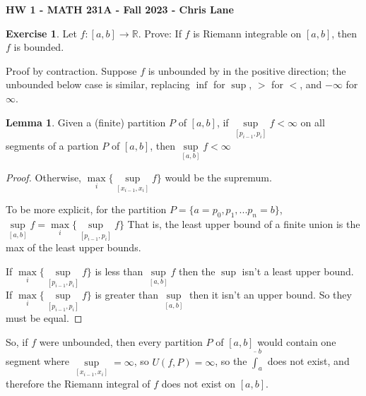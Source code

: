\documentclass[11pt,oneside]{article}
\numberwithin{equation}{section}
\theoremstyle{definition}
\newtheorem{exercise}{Exercise}
\def\RR{\mathbb{R}}
\newtheorem{lemma}{Lemma}
\begin{document}
\textbf{HW 1 - MATH 231A - Fall 2023 - Chris Lane}

\begin{exercise}
Let $ f : [a, b] \to \RR$. Prove: If $f$ is Riemann integrable on $[a, b]$, then $f$ is bounded.

\end{exercise}
\begin{solution}
  Proof by contraction.  Suppose $f$ is unbounded by in the positive direction;
  the unbounded below case is similar, replacing $\inf$ for $\sup$, $>$ for $<$,
  and $ - \infty $ for $ \infty$.  
  \begin{lemma}
    Given a (finite) partition $ P $ of $ [ a, b] $,  if
    $ \sup \limits_{[p_{i-1}, p_i]}f < \infty $ on all segments of a partion
    $P$ of $[a, b]$, then $\sup \limits_{[a,b]} f < \infty $
\end{lemma}
  \begin{proof}
    Otherwise, $ \max \limits_{i} \{ \sup \limits_{[x_{i-1}, x_ i]} f \} $
    would be the supremum.

    To be more explicit, for the partition $ P = \{ a= p_0, p_1, ... p_n = b \}$,
    $ \sup\limits_{[a, b]} f = \max\limits_{i} \{ \sup\limits_{[p _ {i-1}, p _ i]} f \}$
    That is, the least upper bound of a finite union is the max of the least upper bounds.

    If $ \max \limits_i \{ \sup \limits_{[p_{i-1}, p_i]} f \} $ is less than $ \sup \limits_{[a,b]} f $
    then the $\sup$ isn't a least upper bound. 
    If $ \max \limits_i \{ \sup \limits_{[p_{i-1}, p_i]} f \} $ is greater
    than $ \sup \limits_{[a,b]}$ then it
    isn't an upper bound. So they must be equal.  
  \end{proof}

  So, if $f$ were unbounded, then every partition $P$ of $[a,b]$ would
  contain one segment where $\sup \limits_{[x _ {i-1}, x_ i]} = \infty$,
  so $ U ( f, P) = \infty $, so
  the $ \overline \int _ { a} ^ {b} $ does not exist, and
  therefore the Riemann integral of $f$ does not exist on $ [a , b]$.   
\end{solution}
\end{document}
